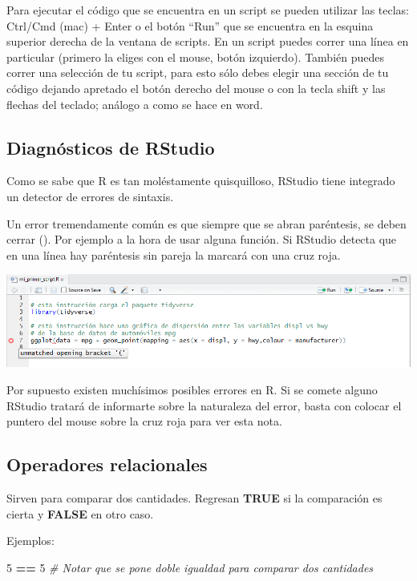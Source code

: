 \documentclass[]{book}
\newenvironment{Shaded}{\begin{snugshade}}{\end{snugshade}}
\newcommand{\DecValTok}[1]{\textcolor[rgb]{0.00,0.00,0.81}{#1}}
\newcommand{\StringTok}[1]{\textcolor[rgb]{0.31,0.60,0.02}{#1}}
\newcommand{\CommentTok}[1]{\textcolor[rgb]{0.56,0.35,0.01}{\textit{#1}}}
\newcommand{\OperatorTok}[1]{\textcolor[rgb]{0.81,0.36,0.00}{\textbf{#1}}}
\theoremstyle{definition}
\theoremstyle{definition}
\theoremstyle{definition}
\theoremstyle{remark}
\begin{document}
Para ejecutar el código que se encuentra en un script se pueden utilizar
las teclas: Ctrl/Cmd (mac) + Enter o el botón ``Run'' que se encuentra
en la esquina superior derecha de la ventana de scripts. En un script
puedes correr una línea en particular (primero la eliges con el mouse,
botón izquierdo). También puedes correr una selección de tu script, para
esto sólo debes elegir una sección de tu código dejando apretado el
botón derecho del mouse o con la tecla shift y las flechas del teclado;
análogo a como se hace en word.

\subsection{Diagnósticos de RStudio}\label{diagnosticos-de-rstudio}

Como se sabe que R es tan moléstamente quisquilloso, RStudio tiene
integrado un detector de errores de sintaxis.

Un error tremendamente común es que siempre que se abran paréntesis, se
deben cerrar (). Por ejemplo a la hora de usar alguna función. Si
RStudio detecta que en una línea hay paréntesis sin pareja la marcará
con una cruz roja.

\includegraphics[width=13.93in]{./imagenes/5_unmatched_bracket}

Por supuesto existen muchísimos posibles errores en R. Si se comete
alguno RStudio tratará de informarte sobre la naturaleza del error,
basta con colocar el puntero del mouse sobre la cruz roja para ver esta
nota.

\subsection{Operadores relacionales}\label{operadores-relacionales}

Sirven para comparar dos cantidades. Regresan \textbf{TRUE} si la
comparación es cierta y \textbf{FALSE} en otro caso.

Ejemplos:

\begin{Shaded}
\begin{Highlighting}[]
\DecValTok{5} \OperatorTok{==}\StringTok{ }\DecValTok{5} \CommentTok{# Notar que se pone doble igualdad para comparar dos cantidades}
\end{Highlighting}
\end{Shaded}
\end{document}
